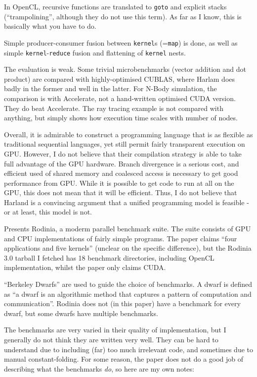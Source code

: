 \documentclass[a4paper, oneside, final]{memoir}
\begin{document}
In OpenCL, recursive functions are translated to \texttt{goto} and
explicit stacks (``trampolining'', although they do not use this
term).  As far as I know, this is basically what you have to do.

Simple producer-consumer fusion between \texttt{kernel}s
(=\texttt{map}) is done, as well as simple
\texttt{kernel}-\texttt{reduce} fusion and flattening of
\texttt{kernel} nests.

The evaluation is weak.  Some trivial microbenchmarks (vector addition
and dot product) are compared with highly-optimised CUBLAS, where
Harlam does badly in the former and well in the latter.  For N-Body
simulation, the comparison is with Accelerate, not a hand-written
optimised CUDA version.  They do beat Accelerate.  The ray tracing
example is not compared with anything, but simply shows how execution
time scales with number of nodes.

Overall, it is admirable to construct a programming language that is
as flexible as traditional sequential languages, yet still permit
fairly transparent execution on GPU.  However, I do not believe that
their compilation strategy is able to take full advantage of the GPU
hardware.  Branch divergence is a serious cost, and efficient used of
shared memory and coalesced access is necessary to get good
performance from GPU.  While it is possible to get code to run at all
on the GPU, this does not mean that it will be efficient.  Thus, I do
not believe that Harland is a convincing argument that a unified
programming model is feasible - or at least, this model is not.

\begin{quote}
\end{quote}

Presents Rodinia, a moderm parallel benchmark suite.  The suite
consists of GPU and CPU implementations of fairly simple programs.
The paper claims ``four applications and five kernels'' (unclear on
the specific difference), but the Rodinia 3.0 tarball I fetched has 18
benchmark directories, including OpenCL implementation, whilst the
paper only claims CUDA.

``Berkeley Dwarfs'' are used to guide the choice of benchmarks.  A
dwarf is defined as ``a dwarf is an algorithmic method that captures a
pattern of computation and communication''.  Rodinia does not (in this
paper) have a benchmark for every dwarf, but some dwarfs have multiple
benchmarks.

The benchmarks are very varied in their quality of implementation, but
I generally do not think they are written very well.  They can be hard
to understand due to including (far) too much irrelevant code, and
sometimes due to manual constant-folding.  For some reason, the paper
does not do a good job of describing what the benchmarks \textit{do},
so here are my own notes:
\end{document}

